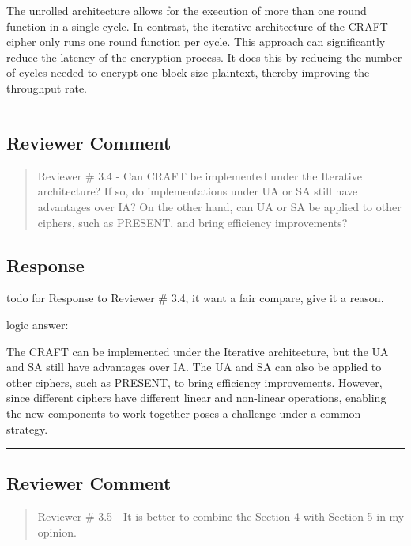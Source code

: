 The unrolled architecture allows for the execution of more than one round function in a single cycle. In contrast, the iterative architecture of the CRAFT cipher only runs one round function per cycle. This approach can significantly reduce the latency of the encryption process. It does this by reducing the number of cycles needed to encrypt one block size plaintext, thereby improving the throughput rate.
\color{black}

\noindent\rule{\linewidth}{2.0pt}

\subsection{Reviewer Comment}
\begin{mdframed}
	\begin{quote}
		Reviewer \# 3.4 - Can CRAFT be implemented under the Iterative architecture? If so, do implementations under UA or SA still have advantages over IA? On the other hand, can UA or SA be applied to other ciphers, such as PRESENT, and bring efficiency improvements?
	\end{quote}
\end{mdframed}

\subsection{Response}

todo for Response to Reviewer \# 3.4, it want a fair compare, give it a reason.

logic answer:

The CRAFT can be implemented under the Iterative architecture, but the UA and SA still have advantages over IA. The UA and SA can also be applied to other ciphers, such as PRESENT, to bring efficiency improvements. However, since different ciphers have different linear and non-linear operations, enabling the new components to work together poses a challenge under a common strategy.

\noindent\rule{\linewidth}{2.0pt}

\subsection{Reviewer Comment}
\begin{mdframed}
	\begin{quote}
		Reviewer \# 3.5 - It is better to combine the Section 4 with Section 5 in my opinion.
	\end{quote}
\end{mdframed}

